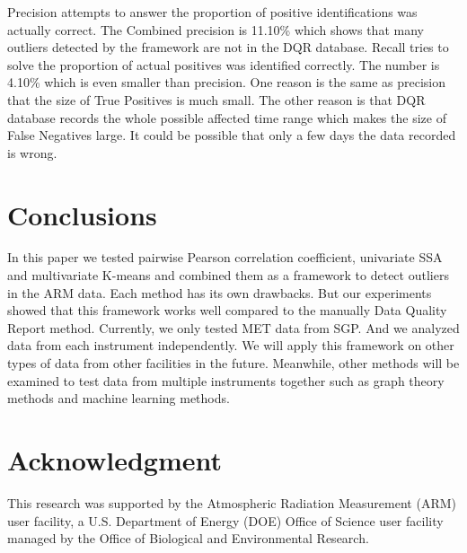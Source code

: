 \documentclass[letterpaper, 10 pt, conference]{ieeeconf}  %
\begin{document}
Precision attempts to answer the proportion of positive identifications was actually correct. The Combined precision is 11.10\% which shows that many outliers detected by the framework are not in the DQR database. Recall tries to solve the proportion of actual positives was identified correctly. The number is 4.10\% which is even smaller than precision. One reason is the same as precision that the size of True Positives is much small. The other reason is that DQR database records the whole possible affected time range which makes the size of False Negatives large. It could be possible that only a few days the data recorded is wrong.

\section{Conclusions}
In this paper we tested pairwise Pearson correlation coefficient, univariate SSA and multivariate K-means and combined them as a framework to detect outliers in the ARM data. Each method has its own drawbacks. But our experiments showed that this framework works well compared to the manually Data Quality Report method. Currently, we only tested MET data from SGP. And we analyzed data from each instrument independently. We will apply this framework on other types of data from other facilities in the future. Meanwhile, other methods will be examined to test data from multiple instruments together such as graph theory methods \cite{phillips2015graph} and machine learning methods. 


\section*{Acknowledgment}
This research was supported by the Atmospheric Radiation Measurement (ARM) user 
facility, a U.S. Department of Energy (DOE) Office of Science user facility 
managed by the Office of Biological and Environmental Research.


 

\end{document}
